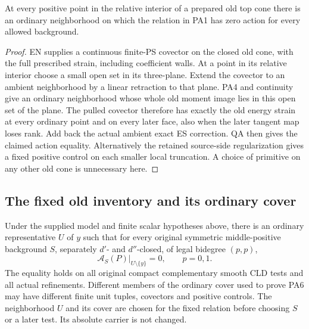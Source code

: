 \begin{corollary}
\label{cor:r13-top-interior-local-action}
At every positive point in the relative interior of a prepared
old top cone there is an ordinary neighborhood on which the
relation in PA1 has zero action for every allowed background.
\end{corollary}

\begin{proof}
EN supplies a continuous finite-PS covector on the closed old
cone, with the full prescribed strain, including coefficient
walls.  At a point in its relative interior choose a small open
set in its three-plane.  Extend the covector to an ambient
neighborhood by a linear retraction to that plane.  PA4 and
continuity give an ordinary neighborhood whose whole old moment
image lies in this open set of the plane.  The pulled covector
therefore has exactly the old energy strain at every ordinary
point and on every later face, also when the later tangent map
loses rank.  Add back the actual ambient exact ES correction.
QA then gives the claimed action equality.  Alternatively the
retained source-side regularization gives a fixed positive
control on each smaller local truncation.  A choice of primitive
on any other old cone is unnecessary here.
\end{proof}

\subsection{The fixed old inventory and its ordinary cover}

\begin{theorem}
\label{thm:r13-punctured-quadratic-action}
Under the supplied model and finite scalar hypotheses above,
there is an ordinary representative $U$ of $y$ such that for
every original symmetric middle-positive background $S$,
separately $d'$- and $d''$-closed, of legal bidegree $(p,p)$,
\[
                   \mathcal A_S(P)|_{U\setminus\{y\}}=0,
                         \qquad p=0,1.
 \tag{PA6}
\]
The equality holds on all original compact complementary smooth
CLD tests and all actual refinements.  Different members of the
ordinary cover used to prove PA6 may have different finite unit
tuples, covectors and positive controls.  The neighborhood $U$
and its cover are chosen for the fixed relation before choosing
$S$ or a later test.  Its absolute carrier is not changed.
\end{theorem}

